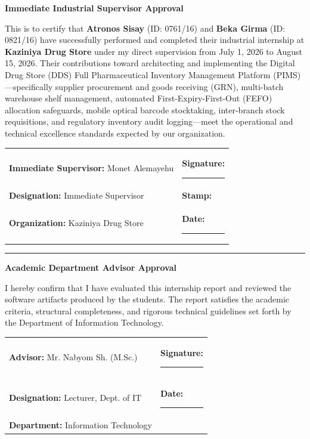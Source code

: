 \begin{singlespace}
\noindent\textbf{\large Immediate Industrial Supervisor Approval}\par
\vspace{0.15cm}
\noindent This is to certify that \textbf{Atronos Sisay} (ID: 0761/16) and \textbf{Beka Girma} (ID: 0821/16) have successfully performed and completed their industrial internship at \textbf{Kaziniya Drug Store} under my direct supervision from July 1, 2026 to August 15, 2026. Their contributions toward architecting and implementing the Digital Drug Store (DDS) Full Pharmaceutical Inventory Management Platform (PIMS)—specifically supplier procurement and goods receiving (GRN), multi-batch warehouse shelf management, automated First-Expiry-First-Out (FEFO) allocation safeguards, mobile optical barcode stocktaking, inter-branch stock requisitions, and regulatory inventory audit logging—meet the operational and technical excellence standards expected by our organization.

\vspace{0.2cm}
\noindent\begin{tabular}{@{}p{}p{}@{}}
\textbf{Immediate Supervisor:} Monet Alemayehu & \textbf{Signature:} \rule{3.2cm}{0.4pt} \\
\textbf{Designation:} Immediate Supervisor & \textbf{Stamp:} \\[0.3cm]
\textbf{Organization:} Kaziniya Drug Store & \textbf{Date:} \rule{3.2cm}{0.4pt} \\
\end{tabular}

\vspace{0.25cm}
\hrule
\vspace{0.25cm}

\noindent\textbf{\large Academic Department Advisor Approval}\par
\vspace{0.15cm}
\noindent I hereby confirm that I have evaluated this internship report and reviewed the software artifacts produced by the students. The report satisfies the academic criteria, structural completeness, and rigorous technical guidelines set forth by the Department of Information Technology.

\vspace{0.2cm}
\noindent\begin{tabular}{@{}p{}p{}@{}}
\textbf{Advisor:} Mr. Nabyom Sh. (M.Sc.) & \textbf{Signature:} \rule{3.2cm}{0.4pt} \\
\textbf{Designation:} Lecturer, Dept. of IT & \textbf{Date:} \rule{3.2cm}{0.4pt} \\
\textbf{Department:} Information Technology & \\
\end{tabular}

\end{singlespace}
\endgroup
\clearpage

